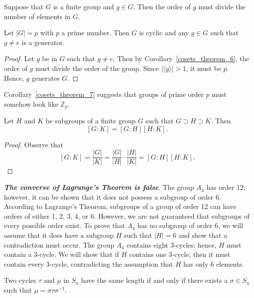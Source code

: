 \begin{corollary}\label{cosets_theorem_6}
Suppose that $G$ is a finite group and $g \in G$.  Then the order of $g$ must divide the number of elements in $G$. 
\end{corollary}

\begin{corollary}\label{cosets_theorem_7}
Let $|G| = p$ with $p$ a prime number.  Then $G$ is cyclic and any $g \in G$ such that $g \neq e$ is a generator. 
\end{corollary}

 
\begin{proof}
Let $g$ be in $G$ such that $g \neq e$.  Then by Corollary~\ref{cosets_theorem_6}, the order of $g$ must divide the order of the group. Since $|\langle g \rangle| > 1$, it must be $p$.  Hence, $g$ generates $G$. 
\end{proof}

\medskip

Corollary~\ref{cosets_theorem_7} suggests that groups of prime order $p$ must somehow look like ${\mathbb Z}_p$. 

\begin{corollary}\label{cosets_theorem_8}
Let $H$ and $K$ be subgroups of a finite group $G$ such that $G \supset H \supset K$.  Then 
\[
[G:K] = [G:H][H:K].
\]
\end{corollary}
 
\begin{proof}
Observe that
\[
[G:K] = \frac{|G|}{|K|} = \frac{|G|}{|H|} \cdot
\frac{|H|}{|K|} = [G:H][H:K].
\]
\end{proof}

\medskip
 
{\bf \em The converse of Lagrange's Theorem is false}.  The group $A_4$ has order 12; however, it can be shown that it does not possess a subgroup of order 6.  According to Lagrange's Theorem, subgroups of a group of order 12 can have orders of either 1, 2, 3, 4, or  6.  However, we are not guaranteed that subgroups of every possible order exist.  To prove that $A_4$ has no subgroup of order 6, we will assume that it does have a subgroup $H$ such that $|H|=6$ and show that a contradiction must occur.  The group $A_4$ contains eight 3-cycles; hence, $H$ must contain a 3-cycle.  We will show that if $H$ contains one 3-cycle, then it must contain every 3-cycle, contradicting the assumption that $H$ has only 6 elements.

\begin{theorem}\label{cosets_theorem_9}
Two cycles $\tau$ and $\mu$ in $S_n$ have the same length if and only if there exists a $\sigma \in S_n$ such that $\mu = \sigma \tau \sigma^{-1}$.  
\end{theorem}
 

